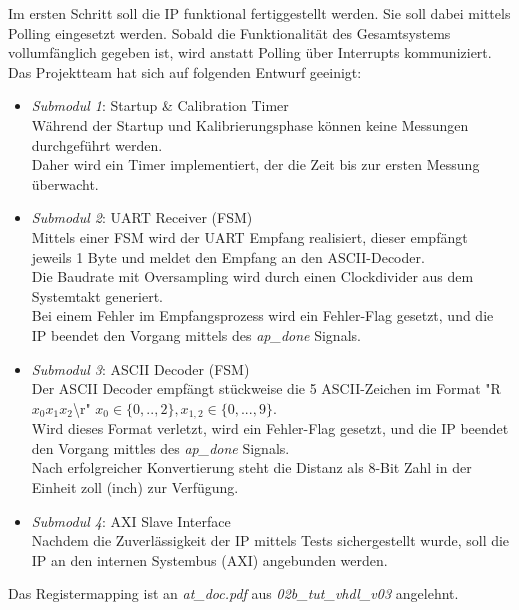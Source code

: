 Im ersten Schritt soll die IP funktional fertiggestellt werden. Sie soll dabei mittels Polling eingesetzt werden. Sobald die Funktionalität des Gesamtsystems vollumfänglich gegeben ist, wird anstatt Polling über Interrupts kommuniziert.\newline
\newline
Das Projektteam hat sich auf folgenden Entwurf geeinigt:

\begin{itemize}
    \item \textit{Submodul 1}: Startup \& Calibration Timer \\
    Während der Startup und Kalibrierungsphase können keine Messungen durchgeführt werden.\\
    Daher wird ein Timer implementiert, der die Zeit bis zur ersten Messung überwacht.
    \item \textit{Submodul 2}: UART Receiver (FSM) \\
    Mittels einer FSM wird der UART Empfang realisiert, dieser empfängt jeweils 1 Byte und meldet den Empfang an den ASCII-Decoder.\\
    Die Baudrate mit Oversampling wird durch einen Clockdivider aus dem Systemtakt generiert.\\
    Bei einem Fehler im Empfangsprozess wird ein Fehler-Flag gesetzt, und die IP beendet den Vorgang mittels des \textit{ap\_done} Signals.
    \item \textit{Submodul 3}: ASCII Decoder (FSM) \\
    Der ASCII Decoder empfängt stückweise die 5 ASCII-Zeichen im Format "R$x_0 x_ 1 x_ 2$\textbackslash r"
    \newline $x_0 \in \{ 0,..,2\}, x_{1,2} \in \{ 0,...,9 \}$.\\
    Wird dieses Format verletzt, wird ein Fehler-Flag gesetzt, und die IP beendet den Vorgang mittles des \textit{ap\_done} Signals.\\
    Nach erfolgreicher Konvertierung steht die Distanz als 8-Bit Zahl in der Einheit zoll (inch) zur Verfügung.
    \item \textit{Submodul 4}: AXI Slave Interface  \\
    Nachdem die Zuverlässigkeit der IP mittels Tests sichergestellt wurde, soll die IP an den internen Systembus (AXI) angebunden werden.
\end{itemize}

Das Registermapping ist an \textit{at\_doc.pdf} aus \textit{02b\_tut\_vhdl\_v03} angelehnt.

